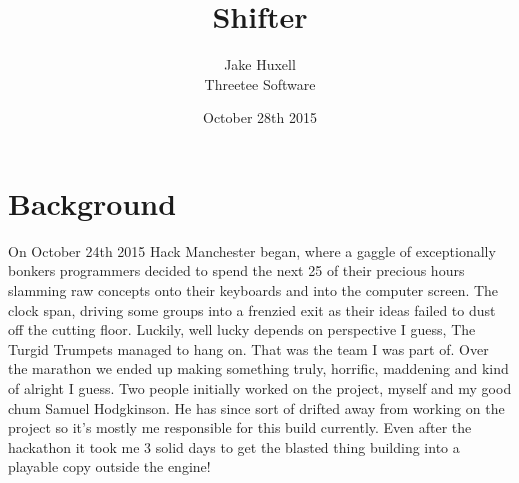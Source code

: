 \documentclass[11pt, a4paper]{article}
\begin{document}
\title{Shifter}
\author{Jake Huxell\\
        Threetee Software}
\date{October 28th 2015}
\maketitle 
\newpage
\tableofcontents
\newpage
\section{Background}
On October 24th 2015 Hack Manchester began, where a gaggle of exceptionally bonkers programmers decided to spend the next 25 of their precious hours slamming raw concepts onto their keyboards and into the computer screen. The clock span, driving some groups into a frenzied exit as their ideas failed to dust off the cutting floor. Luckily, well lucky depends on perspective I guess, The Turgid Trumpets managed to hang on. That was the team I was part of.
Over the marathon we ended up making something truly, horrific, maddening and kind of alright I guess. Two people initially worked on the project, myself and my good chum Samuel Hodgkinson. He has since sort of drifted away from working on the project so it's mostly me responsible for this build currently. Even after the hackathon it took me 3 solid days to get the blasted thing building into a playable copy outside the engine!
\end{document}
